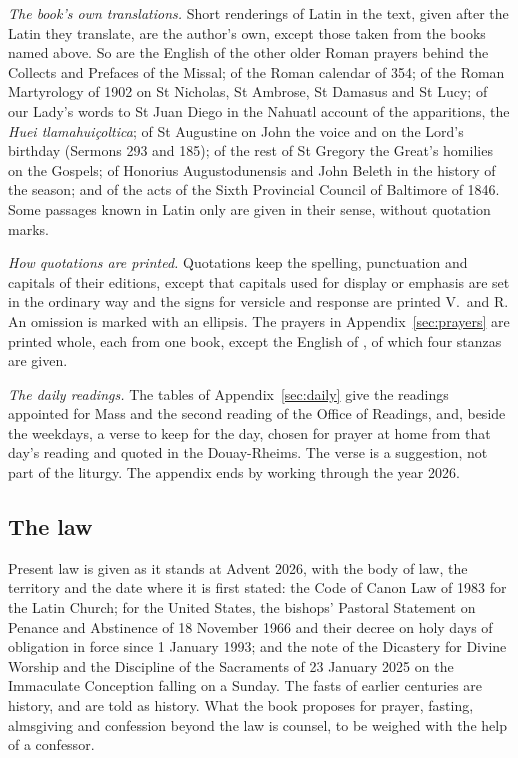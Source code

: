 \textit{The book's own translations.} Short renderings of Latin in the text,
given after the Latin they translate, are the author's own, except those taken
from the books named above. So are the English of the other older Roman prayers
behind the Collects and Prefaces of the Missal; of the Roman calendar of 354; of
the Roman Martyrology of 1902 on St Nicholas, St Ambrose, St Damasus and St
Lucy; of our Lady's words to St Juan Diego in the Nahuatl account of the
apparitions, the \textit{Huei tlamahuiçoltica}; of St Augustine on John the
voice and on the Lord's birthday (Sermons 293 and 185); of the rest of St
Gregory the Great's homilies on the Gospels; of Honorius Augustodunensis
and John Beleth in the history of the season; and of the acts of the Sixth
Provincial Council of Baltimore of 1846. Some passages known in Latin only are
given in their sense, without quotation marks.

\textit{How quotations are printed.} Quotations keep the spelling, punctuation
and capitals of their editions, except that capitals used for display or
emphasis are set in the ordinary way and the signs for versicle and response
are printed V.\ and R. An omission is marked with an ellipsis. The prayers in
Appendix~\ref{sec:prayers} are printed whole, each from one book, except the
English of , of which four stanzas are given.

\textit{The daily readings.} The tables of Appendix~\ref{sec:daily} give the
readings appointed for Mass and the second reading of the Office of Readings,
and, beside the weekdays, a verse to keep for the day, chosen for prayer at
home from that day's reading and quoted in the Douay-Rheims. The verse is a
suggestion, not part of the liturgy. The appendix ends by working through the
year 2026.

\subsection{The law}

Present law is given as it stands at Advent 2026, with the body of law, the
territory and the date where it is first stated: the Code of Canon Law of 1983
for the Latin Church; for the United States, the bishops' Pastoral Statement on
Penance and Abstinence of 18 November 1966 and their decree on holy days of
obligation in force since 1 January 1993; and the note of the Dicastery for
Divine Worship and the Discipline of the Sacraments of 23 January 2025 on the
Immaculate Conception falling on a Sunday. The fasts of earlier centuries are
history, and are told as history. What the book proposes for prayer, fasting,
almsgiving and confession beyond the law is counsel, to be weighed with the help
of a confessor.


